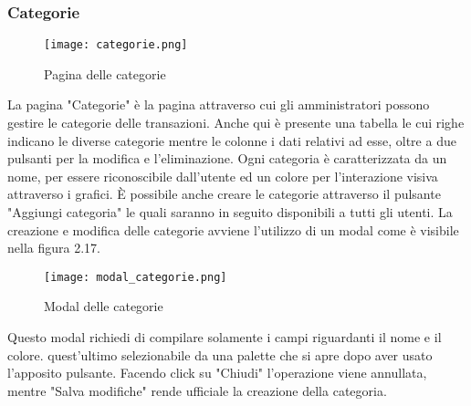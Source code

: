 \documentclass[binding=0.6cm, oneside, noexaminfo, italian]{sapthesis}
\begin{document}
\subsubsection{Categorie}
\begin{figure}[h]
    \centering
    \texttt{[image: categorie.png]}
    \caption{Pagina delle categorie}
    \label{fig:categorie}
\end{figure}
La pagina "Categorie" è la pagina attraverso cui gli amministratori possono gestire le categorie delle transazioni. Anche qui è presente una tabella le cui righe indicano le diverse categorie mentre le colonne i dati relativi ad esse, oltre a due pulsanti per la modifica e l'eliminazione. Ogni categoria è caratterizzata da un nome, per essere riconoscibile dall'utente ed un colore per l'interazione visiva attraverso i grafici. \MakeUppercase{è} possibile anche creare le categorie attraverso il pulsante "Aggiungi categoria" le quali saranno in seguito disponibili a tutti gli utenti. La creazione e modifica delle categorie avviene l'utilizzo di un modal come è visibile nella figura 2.17.
\begin{figure}[h]
    \centering
    \texttt{[image: modal\_categorie.png]}
    \caption{Modal delle categorie}
    \label{fig:modal_categorie}
\end{figure}
Questo modal richiedi di compilare solamente i campi riguardanti il nome e il colore. quest'ultimo selezionabile da una palette che si apre dopo aver usato l'apposito pulsante. Facendo click su "Chiudi" l'operazione viene annullata, mentre "Salva modifiche" rende ufficiale la creazione della categoria.
\end{document}
